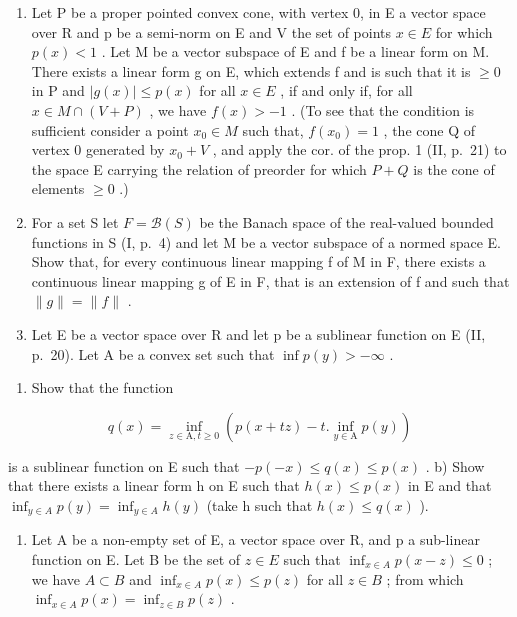 \exercisegroup

\begin{enumerate}
\def\labelenumi{\arabic{enumi})}
\item
  Let P be a proper pointed convex cone, with vertex 0, in E a vector space over R and p be a semi-norm on E and V the set of points \(x \in E\) for which \(p(x) < 1\) . Let M be a vector subspace of E and f be a linear form on M. There exists a linear form g on E, which extends f and is such that it is \(\geqslant 0\) in P and \(|g(x)| \leqslant p(x)\) for all \(x \in E\) , if and only if, for all \(x \in M \cap (V + P)\) , we have \(f(x) > -1\) . (To see that the condition is sufficient consider a point \(x_0 \in M\) such that, \(f(x_0) = 1\) , the cone Q of vertex 0 generated by \(x_0 + V\) , and apply the cor. of the prop. 1 (II, p.~21) to the space E carrying the relation of preorder for which \(P + Q\) is the cone of elements \(\geqslant 0\) .)
\item
  For a set S let \(F = \mathcal{B}(S)\) be the Banach space of the real-valued bounded functions in S (I, p.~4) and let M be a vector subspace of a normed space E. Show that, for every continuous linear mapping f of M in F, there exists a continuous linear mapping g of E in F, that is an extension of f and such that \(\|g\| = \|f\|\) .
\item
  Let E be a vector space over R and let p be a sublinear function on E (II, p.~20). Let A be a convex set such that \(\inf p(y) > -\infty\) .
\end{enumerate}

\begin{enumerate}
\def\labelenumi{\alph{enumi})}
\tightlist
\item
  Show that the function
\end{enumerate}

\[
q (x) = \inf _ {z \in \mathrm{A}, t \geqslant 0} \left(p (x + t z) - t. \inf _ {y \in \mathrm{A}} p (y)\right)
\]

is a sublinear function on E such that \(-p(-x) \leqslant q(x) \leqslant p(x)\) . b) Show that there exists a linear form h on E such that \(h(x) \leqslant p(x)\) in E and that \(\inf_{y \in A} p(y) = \inf_{y \in A} h(y)\) (take h such that \(h(x) \leqslant q(x)\) ).

\begin{enumerate}
\def\labelenumi{\arabic{enumi})}
\setcounter{enumi}{3}
\tightlist
\item
  Let A be a non-empty set of E, a vector space over R, and p a sub-linear function on E. Let B be the set of \(z \in E\) such that \(\inf_{x \in A} p(x - z) \leqslant 0\) ; we have \(A \subset B\) and \(\inf_{x \in A} p(x) \leqslant p(z)\) for all \(z \in B\) ; from which \(\inf_{x \in A} p(x) = \inf_{z \in B} p(z)\) .
\end{enumerate}


